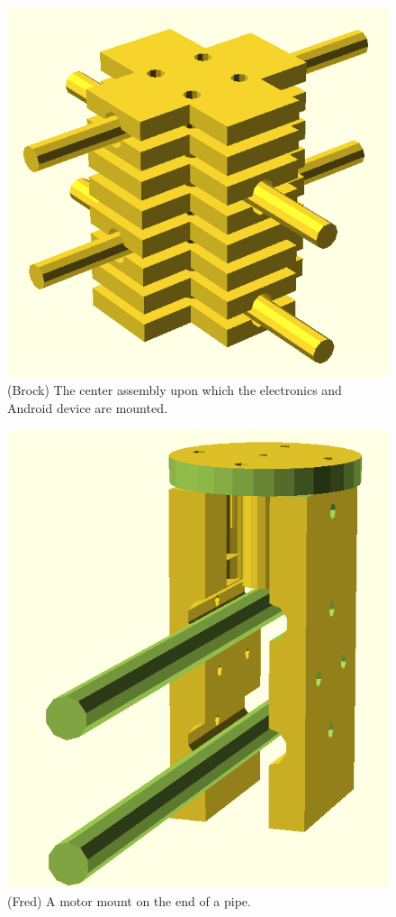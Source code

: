 \documentclass[letterpaper]{article}
\begin{document}
\begin{figure}[htb]
  \centering
  \includegraphics[scale=0.4]{figures/brock_assembly}
  \caption{(Brock) The center assembly upon which the electronics and
    Android device are mounted.}
  \label{fig:brock}
\end{figure}

\begin{figure}[htb]
  \centering
  \includegraphics[scale=0.4]{figures/fred}
  \caption{(Fred) A motor mount on the end of a pipe.}
  \label{fig:fred}
\end{figure}
\end{document}
